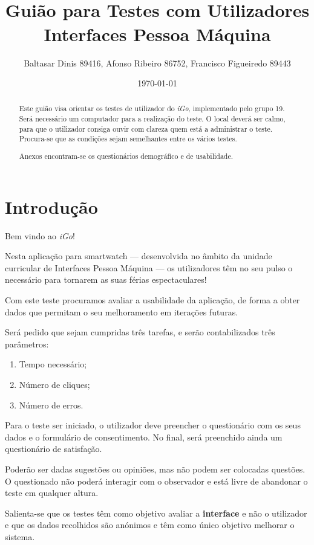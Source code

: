 \documentclass[a4paper]{article}
\title{\igo\\Guião para Testes com Utilizadores\\\small Interfaces Pessoa Máquina}
\author{Baltasar Dinis 89416, Afonso Ribeiro 86752, Francisco Figueiredo 89443}
\date{\today}
\newcommand{\igo}{\textit{iGo}}
\begin{document}
\maketitle

\begin{abstract}
  Este guião visa orientar os testes de utilizador do \igo,
  implementado pelo grupo 19. Será necessário um computador para
  a realização do teste. O local deverá ser calmo, para que o
  utilizador consiga ouvir com clareza quem está a administrar o
  teste. Procura-se que as condições sejam semelhantes entre os
  vários testes.

  Anexos encontram-se os questionários demográfico e de
  usabilidade.
\end{abstract}

  \section{Introdução}

  Bem vindo ao \igo!

  Nesta aplicação para smartwatch --- desenvolvida no âmbito da
  unidade curricular de Interfaces Pessoa Máquina --- os
  utilizadores têm no seu pulso o necessário para tornarem as suas
  férias espectaculares!

  Com este teste procuramos avaliar a usabilidade da aplicação,
  de forma a obter dados que permitam o seu melhoramento em
  iterações futuras.

  Será pedido que sejam cumpridas três tarefas, e serão
  contabilizados três parâmetros:
  \begin{enumerate}
    \item
      Tempo necessário;
    \item
      Número de cliques;
    \item
      Número de erros.
  \end{enumerate}

  Para o teste ser iniciado, o utilizador deve preencher o
  questionário com os seus dados e o formulário de consentimento.
  No final, será preenchido ainda um questionário de satisfação.

  Poderão ser dadas sugestões ou opiniões, mas não podem ser
  colocadas questões. O questionado não poderá interagir com o
  observador e está livre de abandonar o teste em qualquer
  altura.

  Salienta-se que os testes têm como objetivo avaliar a
  \textbf{interface} e não o utilizador e que os dados
  recolhidos são anónimos e têm como único objetivo melhorar o
  sistema.
\end{document}
